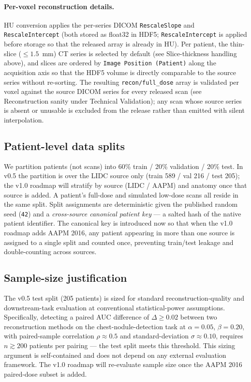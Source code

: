 \documentclass[twoside,11pt]{article}
\begin{document}
\paragraph{Per-voxel reconstruction details.} HU conversion applies the per-series DICOM \texttt{RescaleSlope} and \texttt{RescaleIntercept} (both stored as float32 in HDF5; \texttt{RescaleIntercept} is applied before storage so that the released array is already in HU). Per patient, the thin-slice ($\leq 1.5$~mm) CT series is selected by default (see Slice-thickness handling above), and slices are ordered by \texttt{Image Position (Patient)} along the acquisition axis so that the HDF5 volume is directly comparable to the source series without re-sorting. The resulting \texttt{recon/full\_dose} array is validated per voxel against the source DICOM series for every released scan (see Reconstruction sanity under Technical Validation); any scan whose source series is absent or unusable is excluded from the release rather than emitted with silent interpolation.

\subsection*{Patient-level data splits}

We partition patients (not scans) into 60\% train / 20\% validation / 20\% test. In v0.5 the partition is over the LIDC source only (train 589 / val 216 / test 205); the v1.0 roadmap will stratify by source (LIDC / AAPM) and anatomy once that source is added. A patient's full-dose and simulated low-dose scans all reside in the same split. Split assignments are deterministic given the published random seed (\texttt{42}) and a \emph{cross-source canonical patient key} --- a salted hash of the native patient identifier. The canonical key is introduced now so that when the v1.0 roadmap adds AAPM 2016, any patient appearing in more than one source is assigned to a single split and counted once, preventing train/test leakage and double-counting across sources.

\subsection*{Sample-size justification}

The v0.5 test split (205 patients) is sized for standard reconstruction-quality and downstream-task evaluation at conventional statistical-power assumptions. Specifically, detecting a paired AUC difference of $\Delta \geq 0.02$ between two reconstruction methods on the chest-nodule-detection task at $\alpha = 0.05$, $\beta = 0.20$, with paired-sample correlation $\rho \approx 0.5$ and standard-deviation $\sigma \approx 0.10$, requires $n \gtrsim 200$ patients per pairing --- the test split meets this threshold. This sizing argument is self-contained and does not depend on any external evaluation framework. The v1.0 roadmap will re-evaluate sample size once the AAPM 2016 paired-dose subset is added.
\end{document}
